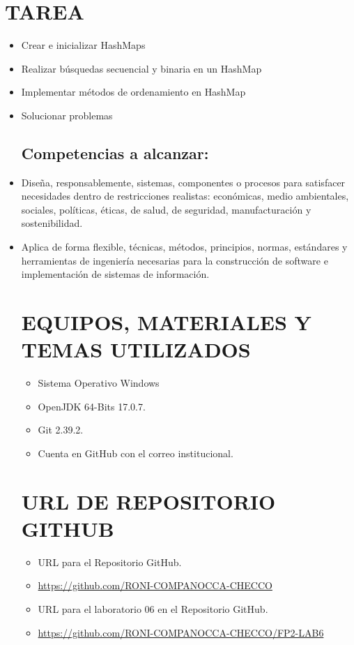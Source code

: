\documentclass{article}
\begin{document}
    \section{TAREA}
	\begin{itemize}	
    \subsection{Objetivos:}
		\item Crear e inicializar HashMaps
		\item Realizar búsquedas secuencial y binaria en un HashMap
        \item Implementar métodos de ordenamiento en HashMap
        \item Solucionar problemas
    \subsection{Competencias a alcanzar:}
		\item Diseña, responsablemente, sistemas, componentes o procesos para satisfacer necesidades dentro de restricciones realistas: económicas, medio ambientales, sociales, políticas, éticas, de salud, de seguridad, manufacturación y sostenibilidad.
        \item Aplica de forma flexible, técnicas, métodos, principios, normas, estándares y herramientas de ingeniería necesarias para la construcción de software e implementación de sistemas de información.

    \section{EQUIPOS, MATERIALES Y TEMAS UTILIZADOS}
	\begin{itemize}
		\item Sistema Operativo Windows
		\item OpenJDK 64-Bits 17.0.7.
		\item Git 2.39.2.	
  	\item Cuenta en GitHub con el correo institucional.
	\end{itemize}

    \section{URL DE REPOSITORIO GITHUB}
	\begin{itemize}
		\item URL para el Repositorio GitHub.
		\item \url{https://github.com/RONI-COMPANOCCA-CHECCO}
		\item URL para el laboratorio 06 en el Repositorio GitHub.	
        \item \url{https://github.com/RONI-COMPANOCCA-CHECCO/FP2-LAB6}
	\end{itemize}
    

\end{itemize}
\end{document}
